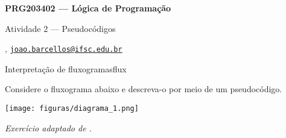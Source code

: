 





\begin{Large}
    \textbf{PRG203402 --- Lógica de Programação}
    
    Atividade 2 --- Pseudocódigos \hfill {}
\end{Large}

\vspace{1ex}
\textbf{} , \href{mailto:joao.barcellos@ifsc.edu.br}{\texttt{joao.barcellos@ifsc.edu.br}}\\
\textbf{}


\vspace{2ex}

\begin{problem}{Interpretação de fluxogramas}{flux}

Considere o fluxograma abaixo e descreva-o por meio de um pseudocódigo.

\begin{center}
    \texttt{[image: figuras/diagrama\_1.png]}
\end{center}

\textit{\footnotesize Exercício adaptado de \cite{uninove_2013}.}

\end{problem}

\newpage

\printbibliography


